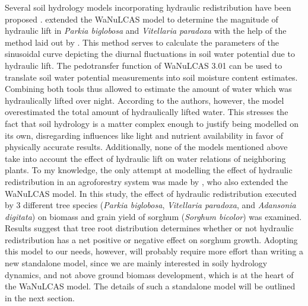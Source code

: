 Several soil hydrology models incorporating hydraulic redistribution have been proposed \parencite[e.g.,][]{gou_groundwater-soil-plant-atmosphere_2014,ryel_hydraulic_2002}.  \textcite{bayala_hydraulic_2008} extended the WaNuLCAS model \parencite{noordwijk_wanulcas_2011} to determine the magnitude of hydraulic lift in \emph{Parkia biglobosa} and \emph{Vitellaria paradoxa} with the help of the method laid out by \textcite{emerman_hydraulic_1996}.  This method serves to calculate the parameters of the sinusoidal curve depicting the diurnal fluctuations in soil water potential due to hydraulic lift.  The pedotransfer function of WaNuLCAS 3.01 \parencite{noordwijk_wanulcas_2004} can be used to translate soil water potential measurements into soil moisture content estimates.  Combining both tools thus allowed \textcite{bayala_hydraulic_2008} to estimate the amount of water which was hydraulically lifted over night.  According to the authors, however, the model overestimated the total amount of hydraulically lifted water.  This stresses the fact that soil hydrology is a matter complex enough to justify being modelled on its own, disregarding influences like light and nutrient availability in favor of physically accurate results.  Additionally, none of the models mentioned above take into account the effect of hydraulic lift on water relations of neighboring plants.  To my knowledge, the only attempt at modelling the effect of hydraulic redistribution in an agroforestry system was made by \textcite{coulibaly_crop_2014}, who also extended the WaNuLCAS model.  In this study, the effect of hydraulic redistribution executed by 3 different tree species (\emph{Parkia biglobosa}, \emph{Vitellaria paradoxa}, and \emph{Adansonia digitata}) on biomass and grain yield of sorghum (\emph{Sorghum bicolor}) was examined.  Results suggest that tree root distribution determines whether or not hydraulic redistribution has a net positive or negative effect on sorghum growth.  Adopting this model to our needs, however, will probably require more effort than writing a new standalone model, since we are mainly interested in soily hydrology dynamics, and not above ground biomass development, which is at the heart of the WaNuLCAS model.  The details of such a standalone model will be outlined in the next section.

